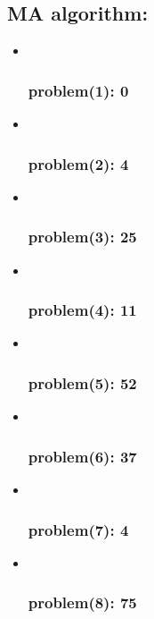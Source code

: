 \documentclass[11pt]{article}
\begin{document}
\hypertarget{ma-algorithm}{%
\subsection{\texorpdfstring{ MA
algorithm:}{  MA algorithm:}}\label{ma-algorithm}}

\begin{itemize}
\item ~
  \hypertarget{problem1-0}{%
  \subsubsection{\texorpdfstring{ problem(1):
  0}{  problem(1): 0}}\label{problem1-0}}
\item ~
  \hypertarget{problem2-4}{%
  \subsubsection{\texorpdfstring{ problem(2):
  4}{  problem(2): 4}}\label{problem2-4}}
\item ~
  \hypertarget{problem3-25}{%
  \subsubsection{\texorpdfstring{ problem(3):
  25}{  problem(3): 25}}\label{problem3-25}}
\item ~
  \hypertarget{problem4-11}{%
  \subsubsection{\texorpdfstring{ problem(4):
  11}{  problem(4): 11}}\label{problem4-11}}
\item ~
  \hypertarget{problem5-52}{%
  \subsubsection{\texorpdfstring{ problem(5):
  52}{  problem(5): 52}}\label{problem5-52}}
\item ~
  \hypertarget{problem6-37}{%
  \subsubsection{\texorpdfstring{ problem(6):
  37}{  problem(6): 37}}\label{problem6-37}}
\item ~
  \hypertarget{problem7-4}{%
  \subsubsection{\texorpdfstring{ problem(7):
  4}{  problem(7): 4}}\label{problem7-4}}
\item ~
  \hypertarget{problem8-75}{%
  \subsubsection{\texorpdfstring{ problem(8):
  75}{  problem(8): 75}}\label{problem8-75}}
\end{itemize}
\end{document}
